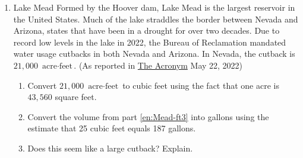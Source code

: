 \begin{enumerate}
\item Lake Mead Formed by the Hoover dam, Lake Mead is the largest reservoir in the United States. Much of the lake straddles the border between Nevada and Arizona, states that have been in a drought for over two decades. Due to record low levels in the lake in 2022, the Bureau of Reclamation mandated water usage cutbacks in both Nevada and Arizona. In Nevada, the cutback is $21,000$ $\text{acre}\cdot\text{feet}$. (As reported in \href{https://sites.imsa.edu/acronym/2022/05/22/the-drought-affecting-lake-mead/}{The Acronym} May 22, 2022)
	\begin{enumerate}
		\item \label{en:Mead-ft3}Convert $21,000$ $\text{acre}\cdot\text{feet}$ to cubic feet using the fact that one acre is $43,560$ square feet.
		\item Convert the volume from part \ref{en:Mead-ft3} into gallons using the estimate that 25 cubic feet equals 187 gallons.
		\item Does this seem like a large cutback? Explain.
	\end{enumerate}



\end{enumerate}
